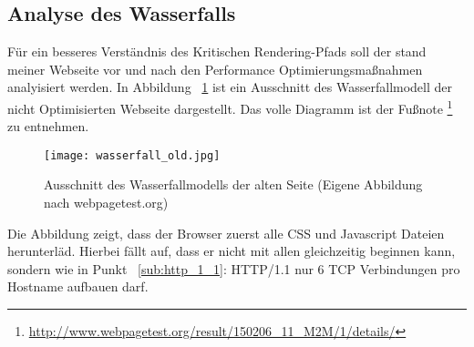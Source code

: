 


	\subsection{Analyse des Wasserfalls}
	\label{sub:analyse_des_wasserfalls}
		Für ein besseres Verständnis des Kritischen Rendering-Pfads soll der stand meiner Webseite vor und nach den Performance Optimierungsmaßnahmen analyisiert werden. In Abbildung ~\ref{fig:wasserfall_old} ist ein Ausschnitt des Wasserfallmodell der nicht Optimisierten Webseite dargestellt. Das volle Diagramm ist der Fußnote \footnote{\url{http://www.webpagetest.org/result/150206_11_M2M/1/details/}} zu entnehmen.

		\begin{figure}[htbp]
			\begin{center}
				\texttt{[image: wasserfall\_old.jpg]}
				\caption{Ausschnitt des Wasserfallmodells der alten Seite (Eigene Abbildung nach webpagetest.org)}
				\label{fig:wasserfall_old}
			\end{center}
		\end{figure}
		
	  Die Abbildung zeigt, dass der Browser zuerst alle CSS und Javascript Dateien herunterläd. Hierbei fällt auf, dass er nicht mit allen gleichzeitig beginnen kann, sondern wie in Punkt ~\ref{sub:http_1_1}: HTTP/1.1 nur 6 TCP Verbindungen pro Hostname aufbauen darf. 





\pagebreak
